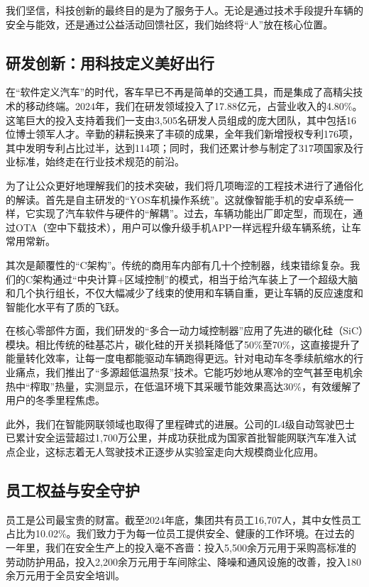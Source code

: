 \documentclass[a4paper,12pt]{article}
\begin{document}
我们坚信，科技创新的最终目的是为了服务于人。无论是通过技术手段提升车辆的安全与能效，还是通过公益活动回馈社区，我们始终将“人”放在核心位置。

\subsection{研发创新：用科技定义美好出行}

在“软件定义汽车”的时代，客车早已不再是简单的交通工具，而是集成了高精尖技术的移动终端。2024年，我们在研发领域投入了17.88亿元，占营业收入的4.80\%。这笔巨大的投入支持着我们一支由3,505名研发人员组成的庞大团队，其中包括16位博士领军人才。辛勤的耕耘换来了丰硕的成果，全年我们新增授权专利176项，其中发明专利占比过半，达到114项；同时，我们还累计参与制定了317项国家及行业标准，始终走在行业技术规范的前沿。

为了让公众更好地理解我们的技术突破，我们将几项晦涩的工程技术进行了通俗化的解读。首先是自主研发的“YOS车机操作系统”。这就像智能手机的安卓系统一样，它实现了汽车软件与硬件的“解耦”。过去，车辆功能出厂即定型，而现在，通过OTA（空中下载技术），用户可以像升级手机APP一样远程升级车辆系统，让车常用常新。

其次是颠覆性的“C架构”。传统的商用车内部有几十个控制器，线束错综复杂。我们的C架构通过“中央计算+区域控制”的模式，相当于给汽车装上了一个超级大脑和几个执行组长，不仅大幅减少了线束的使用和车辆自重，更让车辆的反应速度和智能化水平有了质的飞跃。

在核心零部件方面，我们研发的“多合一动力域控制器”应用了先进的碳化硅（SiC）模块。相比传统的硅基芯片，碳化硅的开关损耗降低了50\%至70\%，这直接提升了能量转化效率，让每一度电都能驱动车辆跑得更远。针对电动车冬季续航缩水的行业痛点，我们推出了“多源超低温热泵”技术。它能巧妙地从寒冷的空气甚至电机余热中“榨取”热量，实测显示，在低温环境下其采暖节能效果高达30\%，有效缓解了用户的冬季里程焦虑。

此外，我们在智能网联领域也取得了里程碑式的进展。公司的L4级自动驾驶巴士已累计安全运营超过1,700万公里，并成功获批成为国家首批智能网联汽车准入试点企业，这标志着无人驾驶技术正逐步从实验室走向大规模商业化应用。

\subsection{员工权益与安全守护}

员工是公司最宝贵的财富。截至2024年底，集团共有员工16,707人，其中女性员工占比为10.02\%。我们致力于为每一位员工提供安全、健康的工作环境。在过去的一年里，我们在安全生产上的投入毫不吝啬：投入5,500余万元用于采购高标准的劳动防护用品，投入2,200余万元用于车间除尘、降噪和通风设施的改善，投入180余万元用于全员安全培训。
\end{document}
